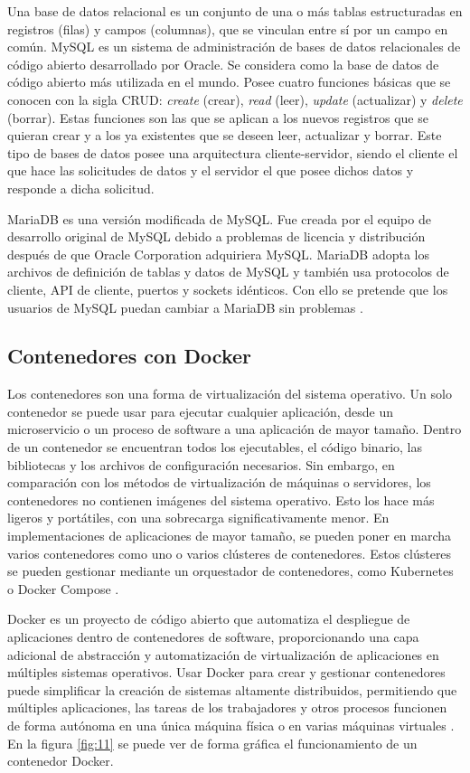 Una base de datos relacional es un conjunto de una o más tablas estructuradas en registros (filas) y campos (columnas), que se vinculan entre sí por un campo en común. MySQL es un sistema de administración de bases de datos relacionales de código abierto desarrollado por Oracle. Se considera como la base de datos de código abierto más utilizada en el mundo. Posee cuatro funciones básicas que se conocen con la sigla CRUD: \textit{create} (crear), \textit{read} (leer), \textit{update} (actualizar) y \textit{delete} (borrar). Estas funciones son las que se aplican a los nuevos registros que se quieran crear y a los ya existentes que se deseen leer, actualizar y borrar. Este tipo de bases de datos posee una arquitectura cliente-servidor, siendo el cliente el que hace las solicitudes de datos y el servidor el que posee dichos datos y responde a dicha solicitud.

MariaDB es una versión modificada de MySQL. Fue creada por el equipo de desarrollo original de MySQL debido a problemas de licencia y distribución después de que Oracle Corporation adquiriera MySQL. MariaDB adopta los archivos de definición de tablas y datos de MySQL y también usa protocolos de cliente, API de cliente, puertos y sockets idénticos. Con ello se pretende que los usuarios de MySQL puedan cambiar a MariaDB sin problemas \citep{20}.

\subsection{Contenedores con Docker}

Los contenedores son una forma de virtualización del sistema operativo. Un solo contenedor se puede usar para ejecutar cualquier aplicación, desde un microservicio o un proceso de software a una aplicación de mayor tamaño. Dentro de un contenedor se encuentran todos los ejecutables, el código binario, las bibliotecas y los archivos de configuración necesarios. Sin embargo, en comparación con los métodos de virtualización de máquinas o servidores, los contenedores no contienen imágenes del sistema operativo. Esto los hace más ligeros y portátiles, con una sobrecarga significativamente menor. En implementaciones de aplicaciones de mayor tamaño, se pueden poner en marcha varios contenedores como uno o varios clústeres de contenedores. Estos clústeres se pueden gestionar mediante un orquestador de contenedores, como Kubernetes o Docker Compose \citep{21}.

Docker es un proyecto de código abierto que automatiza el despliegue de aplicaciones dentro de contenedores de software, proporcionando una capa adicional de abstracción y automatización de virtualización de aplicaciones en múltiples sistemas operativos. Usar Docker para crear y gestionar contenedores puede simplificar la creación de sistemas altamente distribuidos, permitiendo que múltiples aplicaciones, las tareas de los trabajadores y otros procesos funcionen de forma autónoma en una única máquina física o en varias máquinas virtuales \citep{22}. En la figura \ref{fig:11} se puede ver de forma gráfica el funcionamiento de un contenedor Docker.

